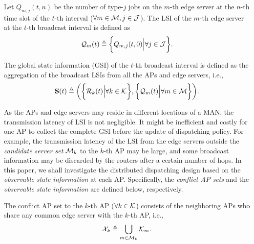 \begin{definition}
    Let $Q_{m,j}({t,n})$ be the number of type-$j$ jobs on the $m$-th edge server at the $n$-th time slot of the $t$-th interval ($\forall m\in\mathcal{M}, j\in\mathcal{J}$).
    The LSI of the $m$-th edge server at the $t$-th broadcast interval is defined as
    \begin{align}
        \mathcal{Q}_{m}(t) \triangleq \bigg\{
            Q_{m,j}(t, 0) \Big| \forall j\in\mathcal{J}
        \bigg\}.
    \end{align}
\end{definition}

\begin{definition}
    The global state information (GSI) of the $t$-th broadcast interval is defined as the aggregation of the broadcast LSIs from all the APs and edge servers, i.e.,
    \begin{align}
        \mathbf{S}(t) \triangleq
            \bigg(
                \bigg\{\mathcal{R}_{k}(t) \Big| \forall k\in\mathcal{K}\bigg\},
                \bigg\{\mathcal{Q}_{m}(t) \Big| \forall m\in\mathcal{M}\bigg\}
            \bigg).
    \end{align}
\end{definition}

As the APs and edge servers may reside in different locations of a MAN, the transmission latency of LSI is not negligible.
It might be inefficient {and costly} for one AP to collect the complete GSI before the update of dispatching policy.
For example, the transmission latency of the LSI from the edge servers outside the \emph{candidate server set} $\mathcal{M}_{k}$ to the $k$-th AP may be large, and some broadcast information may be discarded by the routers after a certain number of hops.
In this paper, we shall investigate the distributed dispatching design based on the \emph{observable state information} at each AP.
Specifically, the \emph{conflict AP sets} and the \emph{observable state information} are defined below, respectively.
\begin{definition}
    The conflict AP set to the $k$-th AP ($\forall k\in\mathcal{K}$) consists of the neighboring APs who share any common edge server with the $k$-th AP, i.e.,
    \begin{align}
        \mathcal{X}_{k} \triangleq \bigcup_{m\in\mathcal{M}_{k}} \mathcal{K}_{m}.
    \end{align}
\end{definition}

